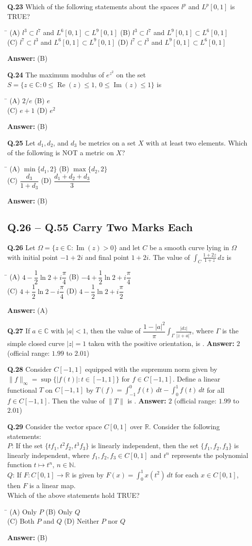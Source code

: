 \documentclass[11pt,a4paper]{article}
\newcommand{\optsfourA}[4]{%
  \begin{tabbing}
    \hspace{0.48\linewidth}\=\kill
    (A) #1 \> (B) #2 \\[2pt]
    (C) #3 \> (D) #4
  \end{tabbing}%
}
\newcommand{\ans}[1]{\textbf{Answer:} #1\par\medskip}
\begin{document}
\textbf{Q.23} Which of the following statements about the spaces $l^p$ and $L^p[0, 1]$ is TRUE?
\optsfourA{$l^3 \subset l^7$ and $L^6[0, 1] \subset L^9[0, 1]$}{$l^3 \subset l^7$ and $L^9[0, 1] \subset L^6[0, 1]$}{$l^7 \subset l^3$ and $L^6[0, 1] \subset L^9[0, 1]$}{$l^7 \subset l^3$ and $L^9[0, 1] \subset L^6[0, 1]$}
\ans{(B)}

\textbf{Q.24} The maximum modulus of $e^{z^2}$ on the set $S = \{z \in \mathbb{C} : 0 \le \operatorname{Re}(z) \le 1,\ 0 \le \operatorname{Im}(z) \le 1\}$ is
\optsfourA{$2/e$}{$e$}{$e + 1$}{$e^2$}
\ans{(B)}

\textbf{Q.25} Let $d_1, d_2$, and $d_3$ be metrics on a set $X$ with at least two elements. Which of the following is NOT a metric on $X$?
\optsfourA{$\min\{d_1, 2\}$}{$\max\{d_2, 2\}$}{$\dfrac{d_3}{1 + d_3}$}{$\dfrac{d_1 + d_2 + d_3}{3}$}
\ans{(B)}

\subsection*{Q.26 -- Q.55 Carry Two Marks Each}

\textbf{Q.26} Let $\Omega = \{z \in \mathbb{C} : \operatorname{Im}(z) > 0\}$ and let $C$ be a smooth curve lying in $\Omega$ with initial point $-1 + 2i$ and final point $1 + 2i$. The value of $\displaystyle\int_C \frac{1 + 2z}{1 + z}\,dz$ is
\optsfourA{$4 - \dfrac{1}{2}\ln 2 + i\dfrac{\pi}{4}$}{$-4 + \dfrac{1}{2}\ln 2 + i\dfrac{\pi}{4}$}{$4 + \dfrac{1}{2}\ln 2 - i\dfrac{\pi}{4}$}{$4 - \dfrac{1}{2}\ln 2 + i\dfrac{\pi}{2}$}
\ans{(A)}

\textbf{Q.27} If $a \in \mathbb{C}$ with $|a| < 1$, then the value of $\dfrac{1 - |a|^2}{\pi}\displaystyle\int_\Gamma \frac{|dz|}{|z + a|^2}$, where $\Gamma$ is the simple closed curve $|z| = 1$ taken with the positive orientation, is \underline{\hspace{2cm}}.
\ans{$2$ (official range: $1.99$ to $2.01$)}

\textbf{Q.28} Consider $C[-1, 1]$ equipped with the supremum norm given by $\|f\|_\infty = \sup\{|f(t)| : t \in [-1, 1]\}$ for $f \in C[-1, 1]$. Define a linear functional $T$ on $C[-1, 1]$ by $T(f) = \displaystyle\int_{-1}^{0} f(t)\,dt - \int_0^1 f(t)\,dt$ for all $f \in C[-1, 1]$. Then the value of $\|T\|$ is \underline{\hspace{2cm}}.
\ans{$2$ (official range: $1.99$ to $2.01$)}

\textbf{Q.29} Consider the vector space $C[0, 1]$ over $\mathbb{R}$. Consider the following statements:\\
$P$: If the set $\{t f_1, t^2 f_2, t^3 f_3\}$ is linearly independent, then the set $\{f_1, f_2, f_3\}$ is linearly independent, where $f_1, f_2, f_3 \in C[0, 1]$ and $t^n$ represents the polynomial function $t \mapsto t^n$, $n \in \mathbb{N}$.\\
$Q$: If $F : C[0, 1] \to \mathbb{R}$ is given by $F(x) = \displaystyle\int_0^1 x(t^2)\,dt$ for each $x \in C[0, 1]$, then $F$ is a linear map.\\
Which of the above statements hold TRUE?
\optsfourA{Only $P$}{Only $Q$}{Both $P$ and $Q$}{Neither $P$ nor $Q$}
\ans{(B)}
\end{document}
